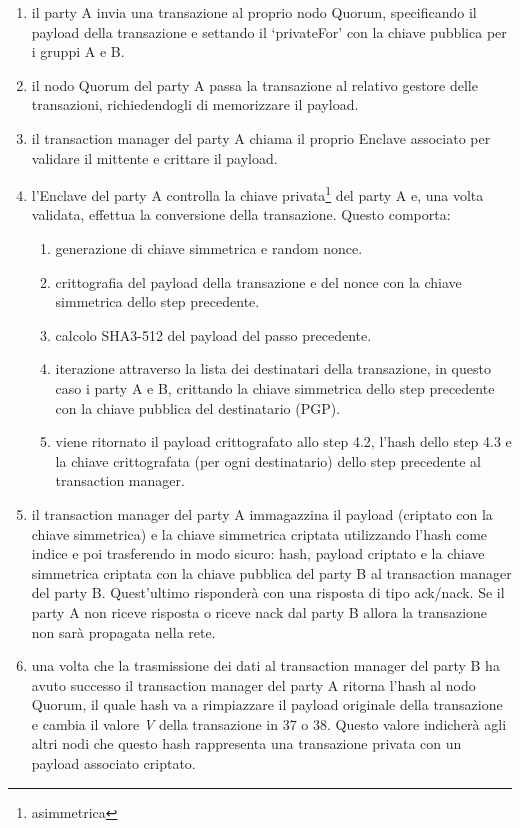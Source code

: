 \begin{enumerate}
	\item il party A invia una transazione al proprio nodo Quorum, specificando il payload della transazione e settando il \enquote*{privateFor} con la chiave pubblica per i gruppi A e B.
	\item il nodo Quorum del party A passa la transazione al relativo gestore delle transazioni, richiedendogli di memorizzare il payload.
	\item il transaction manager del party A chiama il proprio Enclave associato per validare il mittente e crittare il payload.
	\item l'Enclave del party A controlla la chiave privata\footnote{\gls{asimmetrica}} del party A e, una volta validata, effettua la conversione della transazione. Questo comporta: 
	      \begin{enumerate}
	      	\item generazione di chiave simmetrica e random nonce.
	      	\item crittografia del payload della transazione e del nonce con la chiave simmetrica dello step precedente.
	      	\item calcolo SHA3-512 del payload del passo precedente.
	      	\item iterazione attraverso la lista dei destinatari della transazione, in questo caso i party A e B, crittando la chiave simmetrica dello step precedente con la chiave pubblica del destinatario (PGP). 
	      	\item viene ritornato il payload crittografato allo step 4.2, l'hash dello step 4.3 e la chiave crittografata (per ogni destinatario) dello step precedente al transaction manager.
	      \end{enumerate}
	\item il transaction manager del party A immagazzina il payload (criptato con la chiave simmetrica) e la chiave simmetrica criptata utilizzando l'hash come indice e poi trasferendo in modo sicuro: hash, payload criptato e la chiave simmetrica criptata con la chiave pubblica del party B al transaction manager del party B. Quest'ultimo risponderà con una risposta di tipo ack/nack. Se il party A non riceve risposta o riceve nack dal party B allora la transazione non sarà propagata nella rete.
	\item una volta che la trasmissione dei dati al transaction manager del party B ha avuto successo il transaction manager del party A ritorna l'hash al nodo Quorum, il quale hash va a rimpiazzare il payload originale della transazione e cambia il valore \emph{V} della transazione in 37 o 38. Questo valore indicherà agli altri nodi che questo hash rappresenta una transazione privata con un payload associato criptato.

\end{enumerate}
